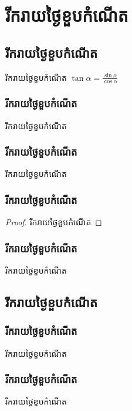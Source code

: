 \documentclass[12pt,a4paper,black]{diamond}
\begin{document}
	\frontmatter
	\tableofcontents
	\mainmatter
	\part{រីករាយថ្ងៃខួបកំណើត}
	\chapter{រីករាយថ្ងៃខួបកំណើត}
	\begin{definition}
		រីករាយថ្ងៃខួបកំណើត $ \tan\alpha=\frac{\sin\alpha}{\cos\alpha} $
	\end{definition}
	\section{រីករាយថ្ងៃខួបកំណើត}
	\begin{example}
		រីករាយថ្ងៃខួបកំណើត
	\end{example}
	\section{រីករាយថ្ងៃខួបកំណើត}
	\begin{theorem}
		រីករាយថ្ងៃខួបកំណើត
	\end{theorem}
	\section{រីករាយថ្ងៃខួបកំណើត}
	\begin{proof}
		រីករាយថ្ងៃខួបកំណើត
	\end{proof}
	\section{រីករាយថ្ងៃខួបកំណើត}
	\begin{proposition}
		រីករាយថ្ងៃខួបកំណើត
	\end{proposition}
	\chapter{រីករាយថ្ងៃខួបកំណើត}
	\section{រីករាយថ្ងៃខួបកំណើត}
	\begin{remark}
		រីករាយថ្ងៃខួបកំណើត
	\end{remark}
	\section{រីករាយថ្ងៃខួបកំណើត}
	\begin{exercise}
		រីករាយថ្ងៃខួបកំណើត
	\end{exercise}
\end{document}

